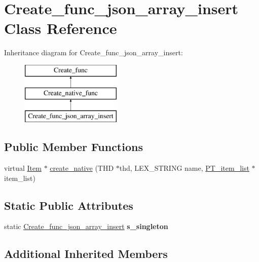 \hypertarget{classCreate__func__json__array__insert}{}\section{Create\+\_\+func\+\_\+json\+\_\+array\+\_\+insert Class Reference}
\label{classCreate__func__json__array__insert}
Inheritance diagram for Create\+\_\+func\+\_\+json\+\_\+array\+\_\+insert\+:\begin{figure}[H]
\begin{center}
\leavevmode
\includegraphics[height=3.000000cm]{classCreate__func__json__array__insert}
\end{center}
\end{figure}
\subsection*{Public Member Functions}
\begin{DoxyCompactItemize}
\item 
virtual \mbox{\hyperlink{classItem}{Item}} $\ast$ \mbox{\hyperlink{classCreate__func__json__array__insert_a891b8b69b675ad8202e4fbe8759ed49d}{create\+\_\+native}} (T\+HD $\ast$thd, L\+E\+X\+\_\+\+S\+T\+R\+I\+NG name, \mbox{\hyperlink{classPT__item__list}{P\+T\+\_\+item\+\_\+list}} $\ast$item\+\_\+list)
\end{DoxyCompactItemize}
\subsection*{Static Public Attributes}
\begin{DoxyCompactItemize}
\item 
\mbox{\label{classCreate__func__json__array__insert_a81587b4499019e8c2b8506a41f0408ae}} 
static \mbox{\hyperlink{classCreate__func__json__array__insert}{Create\+\_\+func\+\_\+json\+\_\+array\+\_\+insert}} {\bfseries s\+\_\+singleton}
\end{DoxyCompactItemize}
\subsection*{Additional Inherited Members}


